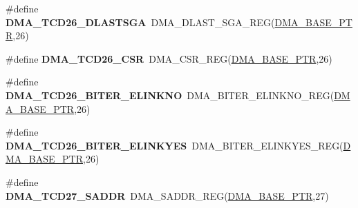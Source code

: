 \begin{DoxyCompactItemize}
\item 
\hypertarget{group___d_m_a___register___accessor___macros_ga448e876566e03d00f266bdf2c3e82442}{}\#define {\bfseries D\+M\+A\+\_\+\+T\+C\+D26\+\_\+\+D\+L\+A\+S\+T\+S\+G\+A}~D\+M\+A\+\_\+\+D\+L\+A\+S\+T\+\_\+\+S\+G\+A\+\_\+\+R\+E\+G(\hyperlink{group___d_m_a___peripheral_ga6997fbc1b1973e9f27170217a3bd6f22}{D\+M\+A\+\_\+\+B\+A\+S\+E\+\_\+\+P\+T\+R},26)\label{group___d_m_a___register___accessor___macros_ga448e876566e03d00f266bdf2c3e82442}

\item 
\hypertarget{group___d_m_a___register___accessor___macros_ga0f941f4431a0b87a01b25fd24be76511}{}\#define {\bfseries D\+M\+A\+\_\+\+T\+C\+D26\+\_\+\+C\+S\+R}~D\+M\+A\+\_\+\+C\+S\+R\+\_\+\+R\+E\+G(\hyperlink{group___d_m_a___peripheral_ga6997fbc1b1973e9f27170217a3bd6f22}{D\+M\+A\+\_\+\+B\+A\+S\+E\+\_\+\+P\+T\+R},26)\label{group___d_m_a___register___accessor___macros_ga0f941f4431a0b87a01b25fd24be76511}

\item 
\hypertarget{group___d_m_a___register___accessor___macros_ga162890b11ca58d27bef86fa86f08da3d}{}\#define {\bfseries D\+M\+A\+\_\+\+T\+C\+D26\+\_\+\+B\+I\+T\+E\+R\+\_\+\+E\+L\+I\+N\+K\+N\+O}~D\+M\+A\+\_\+\+B\+I\+T\+E\+R\+\_\+\+E\+L\+I\+N\+K\+N\+O\+\_\+\+R\+E\+G(\hyperlink{group___d_m_a___peripheral_ga6997fbc1b1973e9f27170217a3bd6f22}{D\+M\+A\+\_\+\+B\+A\+S\+E\+\_\+\+P\+T\+R},26)\label{group___d_m_a___register___accessor___macros_ga162890b11ca58d27bef86fa86f08da3d}

\item 
\hypertarget{group___d_m_a___register___accessor___macros_gaa1dc69b3b88833112dc89097e8c15a17}{}\#define {\bfseries D\+M\+A\+\_\+\+T\+C\+D26\+\_\+\+B\+I\+T\+E\+R\+\_\+\+E\+L\+I\+N\+K\+Y\+E\+S}~D\+M\+A\+\_\+\+B\+I\+T\+E\+R\+\_\+\+E\+L\+I\+N\+K\+Y\+E\+S\+\_\+\+R\+E\+G(\hyperlink{group___d_m_a___peripheral_ga6997fbc1b1973e9f27170217a3bd6f22}{D\+M\+A\+\_\+\+B\+A\+S\+E\+\_\+\+P\+T\+R},26)\label{group___d_m_a___register___accessor___macros_gaa1dc69b3b88833112dc89097e8c15a17}

\item 
\hypertarget{group___d_m_a___register___accessor___macros_ga386c07c6d64d715090a074295b601bfc}{}\#define {\bfseries D\+M\+A\+\_\+\+T\+C\+D27\+\_\+\+S\+A\+D\+D\+R}~D\+M\+A\+\_\+\+S\+A\+D\+D\+R\+\_\+\+R\+E\+G(\hyperlink{group___d_m_a___peripheral_ga6997fbc1b1973e9f27170217a3bd6f22}{D\+M\+A\+\_\+\+B\+A\+S\+E\+\_\+\+P\+T\+R},27)\label{group___d_m_a___register___accessor___macros_ga386c07c6d64d715090a074295b601bfc}


\end{DoxyCompactItemize}
